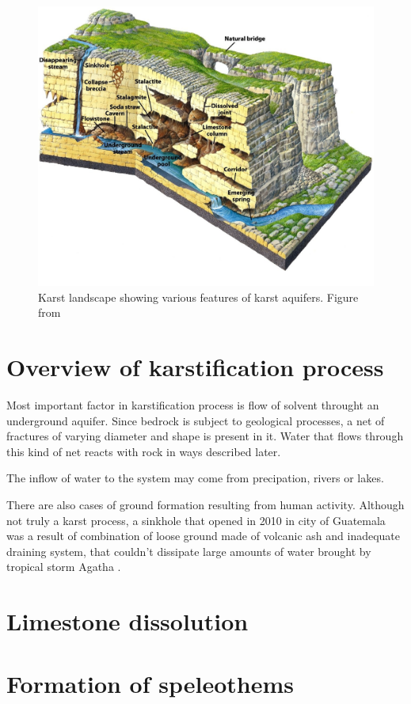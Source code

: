 \begin{figure}
  \centerline{\includegraphics[width=480px]{chapters/karstification/karst_landscape.jpg}}
  \caption{Karst landscape showing various features of karst aquifers.
    Figure from \cite{marshak2006}}
\end{figure}


\section{Overview of karstification process}

Most important factor in karstification process is flow of solvent throught an
underground aquifer. Since bedrock is subject to geological processes, a
net of fractures of varying diameter and shape is present in it. Water that flows
through this kind of net reacts with rock in ways described later.

The inflow of water to the system may come from precipation, rivers or lakes.

There are also cases of ground formation resulting from human activity.
Although not truly a karst process, a sinkhole that opened in 2010 in city of
Guatemala was a result of combination of loose ground made of volcanic ash and
inadequate draining system, that couldn't dissipate large amounts of water
brought by tropical storm Agatha  \parencite{times2010}.



\section{Limestone dissolution}

\section{Formation of speleothems}
